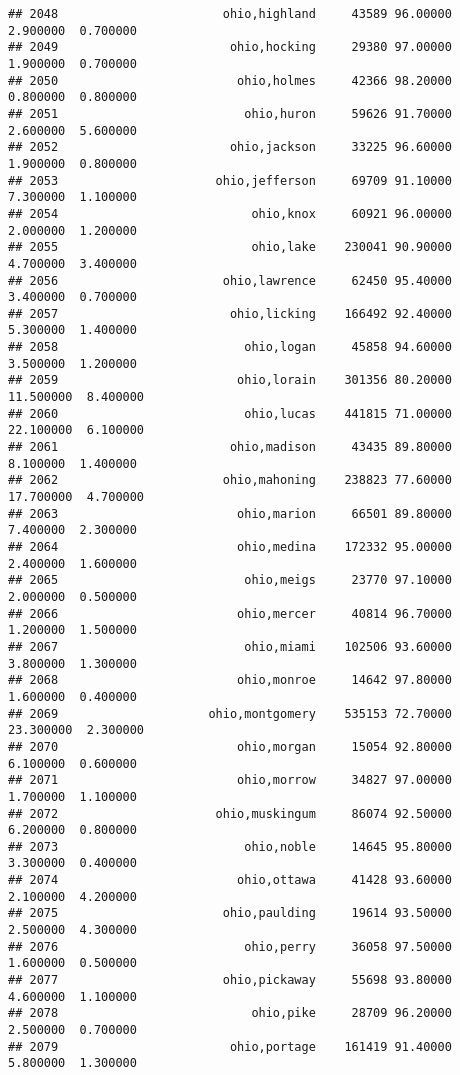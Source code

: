 \documentclass[
]{article}
\begin{document}
\begin{verbatim}
## 2048                       ohio,highland     43589 96.00000  2.900000  0.700000
## 2049                        ohio,hocking     29380 97.00000  1.900000  0.700000
## 2050                         ohio,holmes     42366 98.20000  0.800000  0.800000
## 2051                          ohio,huron     59626 91.70000  2.600000  5.600000
## 2052                        ohio,jackson     33225 96.60000  1.900000  0.800000
## 2053                      ohio,jefferson     69709 91.10000  7.300000  1.100000
## 2054                           ohio,knox     60921 96.00000  2.000000  1.200000
## 2055                           ohio,lake    230041 90.90000  4.700000  3.400000
## 2056                       ohio,lawrence     62450 95.40000  3.400000  0.700000
## 2057                        ohio,licking    166492 92.40000  5.300000  1.400000
## 2058                          ohio,logan     45858 94.60000  3.500000  1.200000
## 2059                         ohio,lorain    301356 80.20000 11.500000  8.400000
## 2060                          ohio,lucas    441815 71.00000 22.100000  6.100000
## 2061                        ohio,madison     43435 89.80000  8.100000  1.400000
## 2062                       ohio,mahoning    238823 77.60000 17.700000  4.700000
## 2063                         ohio,marion     66501 89.80000  7.400000  2.300000
## 2064                         ohio,medina    172332 95.00000  2.400000  1.600000
## 2065                          ohio,meigs     23770 97.10000  2.000000  0.500000
## 2066                         ohio,mercer     40814 96.70000  1.200000  1.500000
## 2067                          ohio,miami    102506 93.60000  3.800000  1.300000
## 2068                         ohio,monroe     14642 97.80000  1.600000  0.400000
## 2069                     ohio,montgomery    535153 72.70000 23.300000  2.300000
## 2070                         ohio,morgan     15054 92.80000  6.100000  0.600000
## 2071                         ohio,morrow     34827 97.00000  1.700000  1.100000
## 2072                      ohio,muskingum     86074 92.50000  6.200000  0.800000
## 2073                          ohio,noble     14645 95.80000  3.300000  0.400000
## 2074                         ohio,ottawa     41428 93.60000  2.100000  4.200000
## 2075                       ohio,paulding     19614 93.50000  2.500000  4.300000
## 2076                          ohio,perry     36058 97.50000  1.600000  0.500000
## 2077                       ohio,pickaway     55698 93.80000  4.600000  1.100000
## 2078                           ohio,pike     28709 96.20000  2.500000  0.700000
## 2079                        ohio,portage    161419 91.40000  5.800000  1.300000

\end{verbatim}
\end{document}
